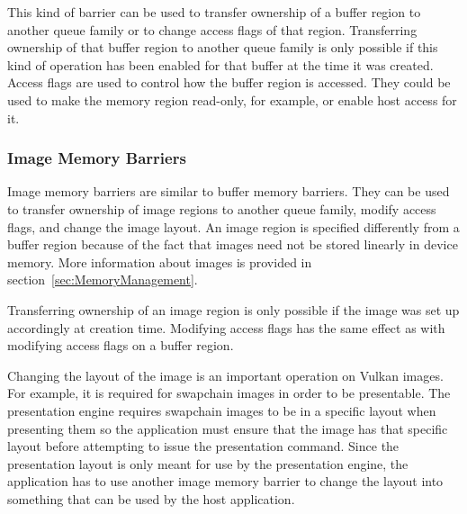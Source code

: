         This kind of barrier can be used to transfer ownership of a buffer region to another queue family or to change access flags of that region.
        Transferring ownership of that buffer region to another queue family is only possible if this kind of operation has been enabled for that buffer at the time it was created.
        Access flags are used to control how the buffer region is accessed.
        They could be used to make the memory region read-only, for example, or enable host access for it.

      \subsubsection{Image Memory Barriers}
        Image memory barriers are similar to buffer memory barriers.
        They can be used to transfer ownership of image regions to another queue family, modify access flags, and change the image layout.
        An image region is specified differently from a buffer region because of the fact that images need not be stored linearly in device memory.
        More information about images is provided in section~\ref{sec:MemoryManagement}.

        Transferring ownership of an image region is only possible if the image was set up accordingly at creation time.
        Modifying access flags has the same effect as with modifying access flags on a buffer region.

        Changing the layout of the image is an important operation on Vulkan images.
        For example, it is required for swapchain images in order to be presentable.
        The presentation engine requires swapchain images to be in a specific layout when presenting them so the application must ensure that the image has that specific layout before attempting to issue the presentation command.
        Since the presentation layout is only meant for use by the presentation engine, the application has to use another image memory barrier to change the layout into something that can be used by the host application.
